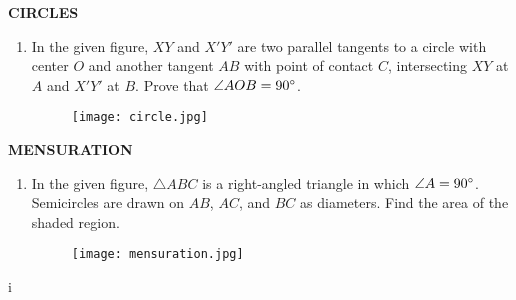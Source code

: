 \documentclass{article}
\begin{document}
\begin{center}
\textbf{CIRCLES}
\end{center}

\begin{enumerate}
    \item In the given figure, $XY$ and $X'Y'$ are two parallel tangents to a circle with center $O$ and another tangent $AB$ with point of contact $C$, intersecting $XY$ at $A$ and $X'Y'$ at $B$. Prove that $\angle AOB = 90\degree$.\\
    \begin{figure}[h!]
        \centering
        \texttt{[image: circle.jpg]}
    \end{figure}
\end{enumerate}

\begin{center}
\textbf{MENSURATION}
\end{center}

\begin{enumerate}
    \item In the given figure, $\triangle ABC$ is a right-angled triangle in which $\angle A = 90\degree$. Semicircles are drawn on $AB$, $AC$, and $BC$ as diameters. Find the area of the shaded region.
    \begin{figure}[h!]
        \centering
        \texttt{[image: mensuration.jpg]}
    \end{figure}
\end{enumerate}
i
\end{document}
